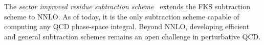 The \textit{sector improved residue subtraction scheme}~\cite{Czakon:2010td} extends the FKS subtraction scheme to \acs{NNLO}. As of today, it is the only subtraction scheme capable of computing any QCD phase-space integral. Beyond \acs{NNLO}, developing efficient and general subtraction schemes remains an open challenge in perturbative QCD.








